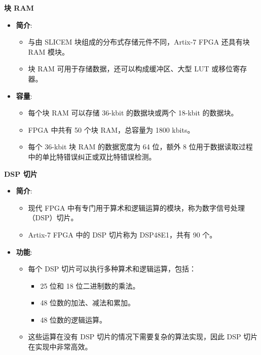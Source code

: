 \begin{frame}{\textbf{块 RAM}}
\begin{itemize}
\tightlist
\item
    \textbf{简介}:

    \begin{itemize}
    \tightlist
    \item
    与由 SLICEM 块组成的分布式存储元件不同，Artix-7 FPGA 还具有块 RAM
    模块。
    \item
    块 RAM 可用于存储数据，还可以构成缓冲区、大型 LUT 或移位寄存器。
    \end{itemize}
\item
    \textbf{容量}:

    \begin{itemize}
    \tightlist
    \item
    每个块 RAM 可以存储 36-kbit 的数据块或两个 18-kbit 的数据块。
    \item
    FPGA 中共有 50 个块 RAM，总容量为 1800 kbits。
    \item
    每个 36-kbit 块 RAM 的数据宽度为 64 位，额外 8
    位用于数据读取过程中的单比特错误纠正或双比特错误检测。
    \end{itemize}
\end{itemize}
\end{frame}

\begin{frame}{\textbf{DSP 切片}}
\begin{itemize}
\tightlist
\item
    \textbf{简介}:

    \begin{itemize}
    \tightlist
    \item
    现代 FPGA
    中有专门用于算术和逻辑运算的模块，称为数字信号处理（DSP）切片。
    \item
    Artix-7 FPGA 中的 DSP 切片称为 DSP48E1，共有 90 个。
    \end{itemize}
\item
    \textbf{功能}:

    \begin{itemize}
    \tightlist
    \item
    每个 DSP 切片可以执行多种算术和逻辑运算，包括：

    \begin{itemize}
    \tightlist
    \item
        25 位和 18 位二进制数的乘法。
    \item
        48 位数的加法、减法和累加。
    \item
        48 位数的逻辑运算。
    \end{itemize}
    \item
    这些运算在没有 DSP 切片的情况下需要复杂的算法实现，因此 DSP
    切片在实现中非常高效。
    \end{itemize}
\end{itemize}
\end{frame}

